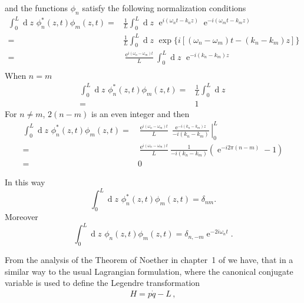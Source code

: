 and the functions $\phi_n$ satisfy the following normalization conditions
\begin{align}
  \int_0^L\operatorname{d}z\,\,\phi_n^*(z,t)\phi_m(z,t)=&\frac{1}{L}\int_0^L\operatorname{d}z\,\,\operatorname{e}^{i(\omega_n t-k_n z)}\operatorname{e}^{-i(\omega_m t-k_m z)}\nonumber\\
=&\frac{1}{L}\int_0^L\operatorname{d}z\,\,\exp\{i[(\omega_n-\omega_m) t-(k_n-k_m) z]\}\nonumber\\
=&\frac{\operatorname{e}^{i(\omega_n-\omega_m)t}}{L}\int_0^L\operatorname{d}z\,\,\operatorname{e}^{-i(k_n-k_m) z}\nonumber\\
\end{align}
When $n=m$
\begin{align}
    \int_0^L\operatorname{d}z\,\,\phi_n^*(z,t)\phi_m(z,t)=&\frac{1}{L}\int_0^L\operatorname{d}z\,\nonumber\\
    =&1
\end{align}
For $n\neq m$, $2(n-m)$ is an even integer and then
\begin{align}
   \int_0^L\operatorname{d}z\,\,\phi_n^*(z,t)\phi_m(z,t)  =&\frac{\operatorname{e}^{i(\omega_n-\omega_m)t}}{L}\left.
\frac{\operatorname{e}^{-i(k_n-k_m) z}}{-i(k_n-k_m)}\right|_0^L\nonumber\\
=&\frac{\operatorname{e}^{i(\omega_n-\omega_m)t}}{L}\frac{1}{-i(k_n-k_m)}
\left(\operatorname{e}^{-i2\pi(n-m) }-1\right)\nonumber\\
=&0
\end{align}
\begin{frame}
In this way
\begin{equation}
\label{eq:7}
  \int_0^L\operatorname{d}z\,\,\phi_n^*(z,t)\phi_m(z,t)=\delta_{nm}.
\end{equation}
Moreover
\begin{equation}
\label{eq:8}
  \int_0^L\operatorname{d}z\,\,\phi_n(z,t)\phi_m(z,t)=\delta_{n,-m}\operatorname{e}^{-2i\omega_nt}.
\end{equation}
\end{frame}
From the analysis of the Theorem of Noether in chapter~1 of \cite{lsm} we have, that in a similar way to the usual Lagrangian formulation, where the canonical conjugate  variable is used to define the Legendre transformation
\begin{align}
  \label{eq:10}
  H=p \dot q-L\,,
\end{align}
